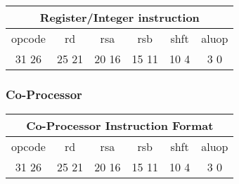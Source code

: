 \documentclass[letterpaper, 11pt]{article}
\begin{document}
\begin{center}
		\begin{tabular}{|c|c|c|c|c|c|}
			\multicolumn{6}{c}{Register/Integer instruction}\\ \hline
				\hspace{2pt} opcode \hspace{2pt} & \hspace{5pt} rd \hspace{5pt} &  \hspace{4pt} rsa \hspace{4pt} & \hspace{4pt}rsb  \hspace{4pt}& \hspace{10pt}shft  \hspace{10pt} & \hspace{3pt} aluop \hspace{3pt}   \\	\hline
			31 \hfill 26& 25 \hfill 21 &20 \hfill  16& 15 \hfill  11&10 \hfill   4&3 \hfill   0\\ \hline
		
	\end{tabular}
\end{center}

\subsubsection{Co-Processor}

\begin{center}
		\begin{tabular}{|c|c|c|c|c|c|}
				\multicolumn{6}{c}{Co-Processor Instruction Format}\\ \hline
				\hspace{2pt} opcode \hspace{2pt} & \hspace{5pt} rd \hspace{5pt} &  \hspace{4pt} rsa \hspace{4pt} & \hspace{4pt}rsb  \hspace{4pt}& \hspace{10pt}shft  \hspace{10pt} & \hspace{3pt} aluop \hspace{3pt}   \\	\hline
			31 \hfill 26& 25 \hfill 21 &20 \hfill  16& 15 \hfill  11&10 \hfill   4&3 \hfill   0\\ \hline
		
	\end{tabular}
\end{center}	
\end{document}
